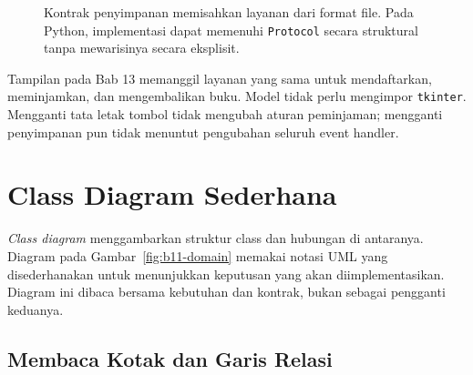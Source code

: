 \begin{figure}[htbp]
\centering
{}
\caption{Kontrak penyimpanan memisahkan layanan dari format file. Pada Python, implementasi dapat memenuhi \texttt{Protocol} secara struktural tanpa mewarisinya secara eksplisit.}
\label{fig:b11-storage}
\end{figure}

Tampilan pada Bab 13 memanggil layanan yang sama untuk mendaftarkan, meminjamkan, dan mengembalikan buku. Model tidak perlu mengimpor \texttt{tkinter}. Mengganti tata letak tombol tidak mengubah aturan peminjaman; mengganti penyimpanan pun tidak menuntut pengubahan seluruh event handler.

\section{Class Diagram Sederhana}

\emph{Class diagram} menggambarkan struktur class dan hubungan di antaranya. Diagram pada Gambar~\ref{fig:b11-domain} memakai notasi UML yang disederhanakan untuk menunjukkan keputusan yang akan diimplementasikan. Diagram ini dibaca bersama kebutuhan dan kontrak, bukan sebagai pengganti keduanya.

\subsection{Membaca Kotak dan Garis Relasi}

